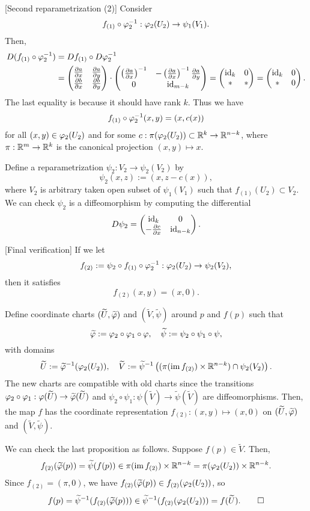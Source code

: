\documentclass{../note}
\begin{document}
\begin{pf}
[Second reparametrization (2)]
Consider
\[f_{(1)}\circ\varphi_2^{-1}:\varphi_2(U_2)\to\psi_1(V_1).\]
Then,
\begin{align*}
D(f_{(1)}\circ\f_2^{-1})
&=Df_{(1)}\circ D\f_2^{-1}\\
&=\begin{pmatrix}\pd{a}{x}&\pd{a}{y}\\\pd{b}{x}&\pd{b}{y}\end{pmatrix}\cdot\begin{pmatrix}\left(\pd{a}{x}\right)^{-1}&-\left(\pd{a}{x}\right)^{-1}\pd{a}{y}\\0&\id_{m-k}\end{pmatrix}
=\begin{pmatrix}\id_k&0\\ * & * \end{pmatrix}
=\begin{pmatrix}\id_k&0\\ * &0\end{pmatrix}.
\end{align*}
The last equality is because it should have rank $k$.
Thus we have
\[f_{(1)}\circ\varphi_2^{-1}(x,y)=(x,c(x))\]
for all $(x,y)\in\varphi_2(U_2)$ and for some $c:\pi(\varphi_2(U_2))\subset\mathbb{R}^k\to\mathbb{R}^{n-k}$, where $\pi:\mathbb{R}^m\to\mathbb{R}^k$ is the canonical projection $(x,y)\mapsto x$.

Define a reparametrization $\psi_2:V_2\to\psi_2(V_2)$ by
\[\psi_2(x,z):=(x,z-c(x)),\]
where $V_2$ is arbitrary taken open subset of $\psi_1(V_1)$ such that $f_{(1)}(U_2)\subset V_2$.
We can check $\psi_2$ is a diffeomorphism by computing the differential
\[D\psi_2=\begin{pmatrix}\id_k&0\\-\pd{c}{x}&\id_{n-k}\end{pmatrix}.\]

[Final verification]
If we let
\[f_{(2)}:=\psi_2\circ f_{(1)}\circ\varphi_2^{-1}:\varphi_2(U_2)\to\psi_2(V_2),\]
then it satisfies
\[f_{(2)}(x,y)=(x,0).\]

Define coordinate charts $(\widetilde U,\widetilde{\varphi})$ and $(\tilde V,\tilde\psi)$ around $p$ and $f(p)$ such that
\[\widetilde{\varphi}:=\varphi_2\circ\varphi_1\circ\varphi,\quad\widetilde\psi:=\psi_2\circ\psi_1\circ\psi,\]
with domains
\[\widetilde U:=\widetilde{\varphi}^{-1}(\varphi_2(U_2)),\quad\widetilde V:=\widetilde\psi^{-1}\left((\pi(\operatorname{im} f_{(2)})\times\mathbb{R}^{n-k})\cap\psi_2(V_2)\right).\]
The new charts are compatible with old charts since the transitions $\varphi_2\circ\varphi_1:\varphi(\widetilde U)\to\widetilde{\varphi}(\widetilde U)$ and $\psi_2\circ\psi_1:\psi(\tilde V)\to\tilde\psi(\tilde V)$ are diffeomorphisms.
Then, the map $f$ has the coordinate representation $f_{(2)}:(x,y)\mapsto(x,0)$ on $(\widetilde U,\widetilde{\varphi})$ and $(\tilde V,\tilde\psi)$.

We can check the last proposition as follows.
Suppose $f(p)\in\tilde V$.
Then,
\[f_{(2)}(\widetilde{\varphi}(p))=\widetilde\psi(f(p))\in\pi(\operatorname{im} f_{(2)})\times\mathbb{R}^{n-k}=\pi(\varphi_2(U_2))\times\mathbb{R}^{n-k}.\]
Since $f_{(2)}=(\pi,0)$, we have $f_{(2)}(\widetilde{\varphi}(p))\in f_{(2)}(\varphi_2(U_2))$, so
\[f(p)=\widetilde\psi^{-1}(f_{(2)}(\widetilde{\varphi}(p)))\in\widetilde\psi^{-1}(f_{(2)}(\varphi_2(U_2)))=f(\widetilde U).\qedhere\]
\end{pf}
\end{document}
